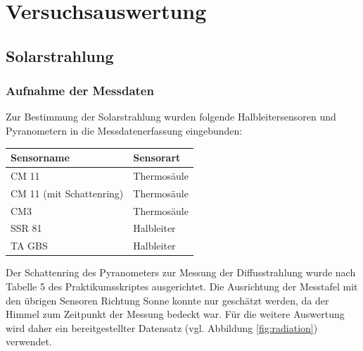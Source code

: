 \section{Versuchsauswertung}

\subsection{Solarstrahlung} 

\subsubsection{Aufnahme der Messdaten}
Zur Bestimmung der Solarstrahlung wurden folgende Halbleitersensoren und Pyranometern in die Messdatenerfassung eingebunden:

\begin{center}
	
\begin{tabular}{l|l}	
	\label{tab:Sensoren}
	\textbf{Sensorname} & \textbf{Sensorart}\\
	\hline
	CM 11 & Thermosäule\\
	CM 11 (mit Schattenring) & Thermosäule\\
	CM3 & Thermosäule\\
	SSR 81 & Halbleiter\\
	TA GBS & Halbleiter
\end{tabular}
\end{center}

Der Schattenring des Pyranometers zur Messung der Diffusstrahlung wurde nach Tabelle 5 des Praktikumsskriptes ausgerichtet. Die Ausrichtung der Messtafel mit den übrigen Sensoren Richtung Sonne konnte nur geschätzt werden, da der Himmel zum Zeitpunkt der Messung bedeckt war. Für die weitere Auswertung wird daher ein bereitgestellter Datensatz (vgl. Abbildung \ref{fig:radiation}) verwendet.

